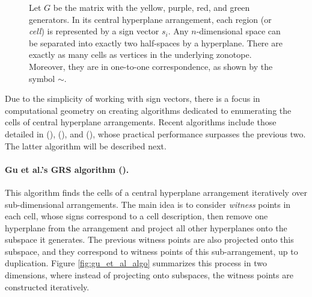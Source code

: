 \begin{figure}[!htb]
\begin{minipage}{0.49\linewidth}
      \end{minipage}
      \caption{Let $G$ be the matrix with the yellow, purple, red, and green generators. In its central hyperplane arrangement, each region (or \emph{cell}) is represented by a sign vector $s_i$. Any $n$-dimensional space can be separated into exactly two half-spaces by a hyperplane. There are exactly as many cells as vertices in the underlying zonotope. Moreover, they are in one-to-one correspondence, as shown by the symbol $\sim$.}
      \label{fig:zonotope_hyperplane_arrangement2}
    \end{figure}

Due to the simplicity of working with sign vectors, there is a focus in computational geometry on creating algorithms dedicated to enumerating the cells of central hyperplane arrangements. Recent algorithms include those detailed in (\cite{radaNewAlgorithmEnumeration2018}), (\cite{guNonparametricMaximumLikelihood2020}), and (\cite{guCounterfactualIdentificationLatent2022}), whose practical performance surpasses the previous two. The latter algorithm will be described next.

\paragraph*{Gu et al.'s GRS algorithm (\cite{guCounterfactualIdentificationLatent2022}).}
This algorithm finds the cells of a central hyperplane arrangement iteratively over sub-dimensional arrangements. The main idea is to consider \emph{witness} points in each cell, whose signs correspond to a cell description, then remove one hyperplane from the arrangement and project all other hyperplanes onto the subspace it generates. The previous witness points are also projected onto this subspace, and they correspond to witness points of this sub-arrangement, up to duplication.
Figure \ref{fig:gu_et_al_algo} summarizes this process in two dimensions, where instead of projecting onto subspaces, the witness points are constructed iteratively.

